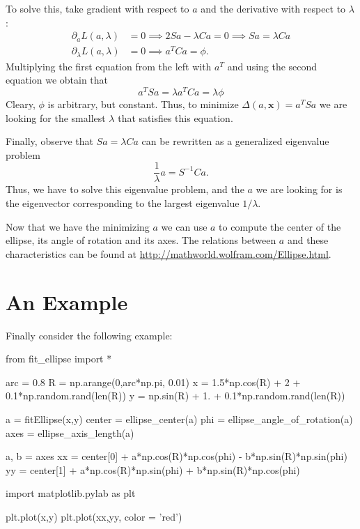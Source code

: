 \documentclass[a4paper,11pt]{article}
\begin{document}
To solve this, take gradient with respect to $a$ and the derivative with respect to $\lambda$:
\begin{align*}
  \partial_a L(a, \lambda) & = 0 \implies 2 S a - \lambda C a  = 0 \implies S a = \lambda C a \\
  \partial_\lambda L(a, \lambda) & = 0 \implies a^T C a = \phi.
\end{align*}
Multiplying the first equation from the left with $a^T$ and using the second equation we obtain that
\begin{equation*}
a^T S a = \lambda a^T C a = \lambda \phi
\end{equation*}
Cleary, $\phi$ is arbitrary, but constant. Thus, to minimize
$\Delta(a, \mathbf{x})= a^T S a$ we are looking for the smallest
$\lambda$ that satisfies this equation.

Finally, observe that $S a = \lambda C a$ can be rewritten as a generalized eigenvalue problem
%
\begin{equation*}
\frac{1}{\lambda} a = S^{-1} C a.
\end{equation*}
Thus, we have to solve this eigenvalue problem, and the $a$ we are looking for is the eigenvector corresponding to the largest eigenvalue $1/\lambda$.

Now that we have the minimizing $a$ we can use $a$ to compute the center of the ellipse, its angle of rotation and its axes.
The relations between $a$ and these characteristics can be found at \url{http://mathworld.wolfram.com/Ellipse.html}.

\section{An Example}

Finally consider the following example:

\begin{pyblock}
from fit_ellipse import *

arc = 0.8
R = np.arange(0,arc*np.pi, 0.01)
x = 1.5*np.cos(R) + 2 + 0.1*np.random.rand(len(R))
y = np.sin(R) + 1. + 0.1*np.random.rand(len(R))

a = fitEllipse(x,y)
center = ellipse_center(a)
phi = ellipse_angle_of_rotation(a)
axes = ellipse_axis_length(a)

a, b = axes
xx = center[0] + a*np.cos(R)*np.cos(phi) - b*np.sin(R)*np.sin(phi)
yy = center[1] + a*np.cos(R)*np.sin(phi) + b*np.sin(R)*np.cos(phi)

import matplotlib.pylab as plt

plt.plot(x,y)
plt.plot(xx,yy, color = 'red')
\end{pyblock}
\end{document}
